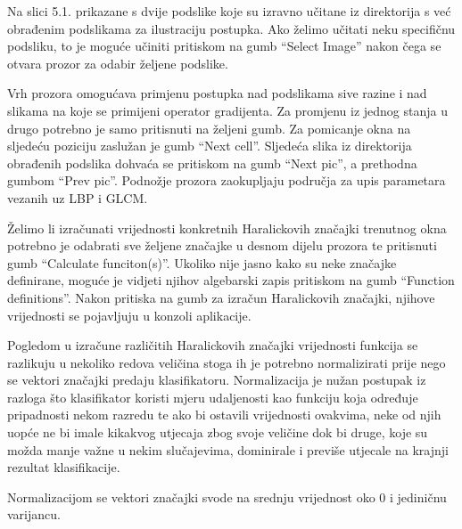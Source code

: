\documentclass[times, utf8, zavrsni]{fer}
\begin{document}
Na slici 5.1. prikazane s dvije podslike koje su izravno učitane iz direktorija
s već obrađenim podslikama za ilustraciju postupka. Ako želimo učitati neku
specifičnu podsliku, to je moguće učiniti pritiskom na gumb \enquote{Select Image}
nakon čega se otvara prozor za odabir željene podslike.

\bigbreak

Vrh prozora omogućava primjenu postupka nad podslikama sive razine i nad slikama
na koje se primijeni operator gradijenta. Za promjenu iz jednog stanja u
drugo potrebno je samo pritisnuti na željeni gumb. Za pomicanje okna na sljedeću
poziciju zaslužan je gumb \enquote{Next cell}. Sljedeća slika iz 
direktorija obrađenih podslika dohvaća se pritiskom na gumb \enquote{Next pic}, a 
prethodna gumbom \enquote{Prev pic}. Podnožje prozora zaokupljaju 
područja za upis parametara vezanih uz LBP i GLCM. 

\bigbreak

Želimo li izračunati vrijednosti konkretnih Haralickovih značajki 
trenutnog okna potrebno je odabrati sve željene značajke u desnom dijelu
prozora te pritisnuti gumb \enquote{Calculate funciton(s)}. Ukoliko
nije jasno kako su neke značajke definirane, moguće je vidjeti njihov
algebarski zapis pritiskom na gumb \enquote{Function definitions}. 
Nakon pritiska na gumb za izračun Haralickovih značajki, njihove vrijednosti
se pojavljuju u konzoli aplikacije. 

\bigbreak

Pogledom u izračune različitih Haralickovih značajki vrijednosti funkcija 
se razlikuju u nekoliko redova veličina stoga ih je potrebno normalizirati
prije nego se vektori značajki predaju klasifikatoru. Normalizacija
je nužan postupak iz razloga što klasifikator koristi mjeru udaljenosti
kao funkciju koja određuje pripadnosti nekom razredu te ako bi ostavili 
vrijednosti ovakvima, neke od njih uopće ne bi imale kikakvog utjecaja zbog 
svoje veličine dok bi druge, koje su možda manje važne u nekim slučajevima,
dominirale i previše utjecale na krajnji rezultat klasifikacije. 

\bigbreak

Normalizacijom se vektori značajki svode na srednju vrijednost oko 0
i jediničnu varijancu.

\bigbreak
\end{document}

